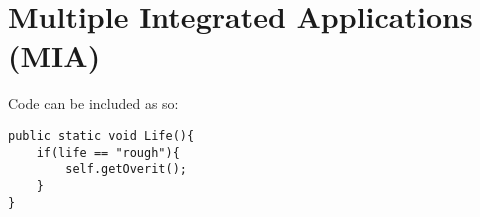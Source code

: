 \chapter{Multiple Integrated Applications (MIA)}

Code can be included as so:

\begin{lstlisting}
public static void Life(){
	if(life == "rough"){
		self.getOverit();
	}
}
\end{lstlisting}